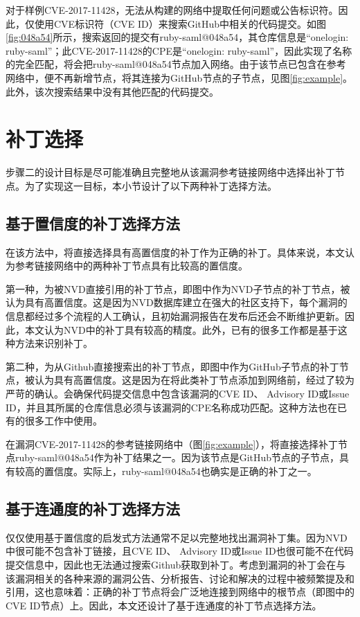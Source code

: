 \begin{exmp}
对于样例CVE-2017-11428，\tool 无法从构建的网络中提取任何问题或公告标识符。因此，\tool 仅使用CVE标识符（CVE ID）来搜索GitHub中相关的代码提交。如图\ref{fig:048a54}所示，搜索返回的提交有ruby-saml@048a54，其仓库信息是“onelogin: ruby-saml”；此CVE-2017-11428的CPE是“onelogin: ruby-saml”，因此实现了名称的完全匹配，\tool 将会把ruby-saml@048a54节点加入网络。由于该节点已包含在参考网络中，\tool 便不再新增节点，将其连接为GitHub节点的子节点，见图\ref{fig:example}。此外，该次搜索结果中没有其他匹配的代码提交。
\end{exmp}   

\section{补丁选择}\label{sec:selection}

步骤二的设计目标是尽可能准确且完整地从该漏洞参考链接网络中选择出补丁节点。为了实现这一目标，本小节设计了以下两种补丁选择方法。

\subsection{基于置信度的补丁选择方法}
在该方法中，\tool 将直接选择具有高置信度的补丁作为正确的补丁。具体来说，本文认为参考链接网络中的两种补丁节点具有比较高的置信度。

第一种，为被NVD直接引用的补丁节点，即图中作为NVD子节点的补丁节点，被认为具有高置信度。这是因为NVD数据库建立在强大的社区支持下，每个漏洞的信息都经过多个流程的人工确认，且初始漏洞报告在发布后还会不断维护更新。因此，本文认为NVD中的补丁具有较高的精度。此外，已有的很多工作\cite{duan2019automating, li2016vulpecker, li2018vuldeepecker}都是基于这种方法来识别补丁。

第二种，为从Github直接搜索出的补丁节点，即图中作为GitHub子节点的补丁节点，被认为具有高置信度。这是因为在将此类补丁节点添加到网络前，经过了较为严苛的确认。\tool 会确保代码提交信息中包含该漏洞的CVE ID、 Advisory ID或Issue ID，并且其所属的仓库信息必须与该漏洞的CPE名称成功匹配。这种方法也在已有的很多工作\cite{you2017semfuzz, Wang2020empirical}中使用。

\begin{exmp}
在漏洞CVE-2017-11428的参考链接网络中（图\ref{fig:example}），\tool 将直接选择补丁节点ruby-saml@048a54作为补丁结果之一。因为该节点是GitHub节点的子节点，具有较高的置信度。实际上，ruby-saml@048a54也确实是正确的补丁之一。
\end{exmp}

\subsection{基于连通度的补丁选择方法}
仅仅使用基于置信度的启发式方法通常不足以完整地找出漏洞补丁集。因为NVD中很可能不包含补丁链接，且CVE ID、 Advisory ID或Issue ID也很可能不在代码提交信息中，因此也无法通过搜索Github获取到补丁。考虑到漏洞的补丁会在与该漏洞相关的各种来源的漏洞公告、分析报告、讨论和解决的过程中被频繁提及和引用，这也意味着：正确的补丁节点将会广泛地连接到网络中的根节点（即图中的CVE ID节点）上。因此，本文还设计了基于连通度的补丁节点选择方法。

